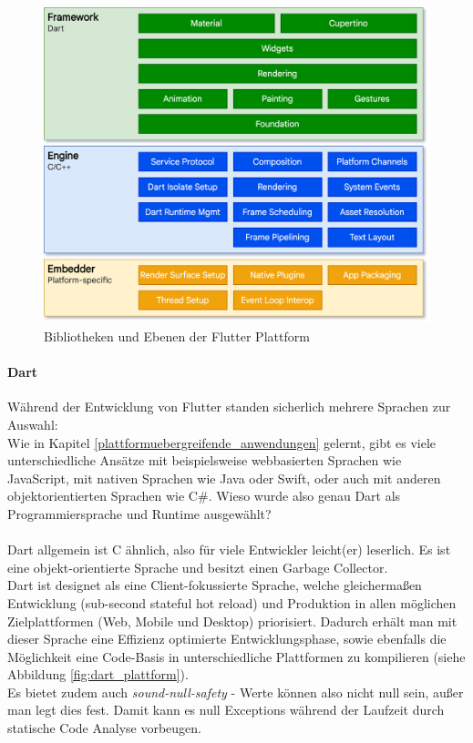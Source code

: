 \begin{figure}[tbt]
	\begin{center}
		\includegraphics[scale=0.25]{images/flutter_architektur.png}
	\end{center}
	\caption{Bibliotheken und Ebenen der Flutter Plattform \protect \footnotemark}
	\label{fig:flutter_plattform}
\end{figure}

\paragraph{Dart}
Während der Entwicklung von Flutter standen sicherlich mehrere Sprachen zur Auswahl: \\Wie in Kapitel \ref{plattformuebergreifende_anwendungen} gelernt, gibt es viele unterschiedliche Ansätze mit beispielsweise webbasierten Sprachen wie JavaScript, mit nativen Sprachen wie Java oder Swift, oder auch mit anderen objektorientierten Sprachen wie C\#. Wieso wurde also genau Dart als Programmiersprache und Runtime ausgewählt?\\
\\
Dart allgemein ist C ähnlich, also für viele Entwickler leicht(er) leserlich. Es ist eine objekt-orientierte Sprache und besitzt einen Garbage Collector.\\
Dart ist designet als eine Client-fokussierte Sprache, welche gleichermaßen Entwicklung (sub-second stateful hot reload) und Produktion in allen möglichen Zielplattformen (Web, Mobile und Desktop) priorisiert. Dadurch erhält man mit dieser Sprache eine Effizienz optimierte Entwicklungsphase, sowie ebenfalls die Möglichkeit eine Code-Basis in unterschiedliche Plattformen zu kompilieren (siehe Abbildung \ref{fig:dart_plattform}).\\
Es bietet zudem auch \textit{sound-null-safety} - Werte können also nicht null sein, außer man legt dies fest. Damit kann es null Exceptions während der Laufzeit durch statische Code Analyse vorbeugen.

